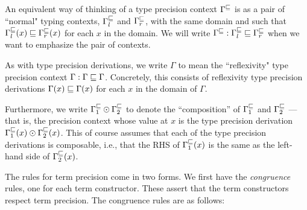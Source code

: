 An equivalent way of thinking of a type precision context $\Gamma^\sqsubseteq$ is as a
pair of ``normal" typing contexts, $\Gamma^\sqsubseteq_l$ and $\Gamma^\sqsubseteq_r$, with the same
domain and such that $\Gamma^\sqsubseteq_l(x) \sqsubseteq \Gamma^\sqsubseteq_r(x)$ for each $x$ in the domain.
We will write $\Gamma^\sqsubseteq : \Gamma^\sqsubseteq_l \sqsubseteq \Gamma^\sqsubseteq_r$ when we want to emphasize the pair of contexts.

As with type precision derivations, we write $\Gamma$ to mean the ``reflexivity" type precision context
$\Gamma : \Gamma \sqsubseteq \Gamma$.
Concretely, this consists of reflexivity type precision derivations $\Gamma(x) \sqsubseteq \Gamma(x)$ for
each $x$ in the domain of $\Gamma$.

Furthermore, we write $\Gamma^\sqsubseteq_1 \odot \Gamma^\sqsubseteq_2$ to denote the ``composition'' of $\Gamma^\sqsubseteq_1$ and $\Gamma^\sqsubseteq_2$
--- that is, the precision context whose value at $x$ is the type precision derivation
$\Gamma^\sqsubseteq_1(x) \odot \Gamma^\sqsubseteq_2(x)$. This of course assumes that each of the type precision
derivations is composable, i.e., that the RHS of $\Gamma^\sqsubseteq_1(x)$ is the same as the left-hand side of $\Gamma^\sqsubseteq_2(x)$.


The rules for term precision come in two forms. We first have the \emph{congruence} rules,
one for each term constructor. These assert that the term constructors respect term precision.
The congruence rules are as follows:

